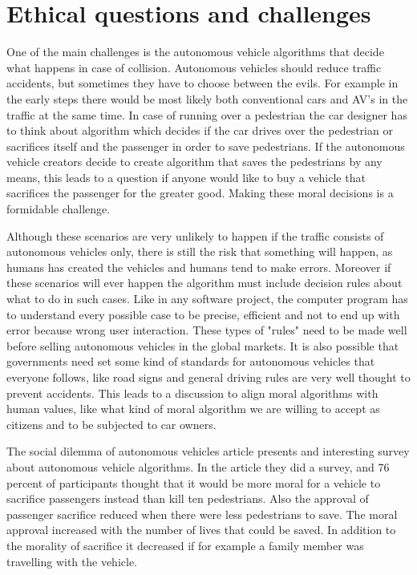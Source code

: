 \documentclass[english]{tktltiki}
\begin{document}
\section{Ethical questions and challenges}
One of the main challenges is the autonomous vehicle algorithms that decide what 
happens in case of collision. \cite{dilemma} Autonomous vehicles should reduce 
traffic accidents, but sometimes they have to choose between the evils. For 
example in the early steps there would be most likely both conventional cars and 
AV's in the traffic at the same time. In case of running over a pedestrian the 
car designer has to think about algorithm which decides if the car drives over 
the pedestrian or sacrifices itself and the passenger in order to save 
pedestrians. If the autonomous vehicle creators decide to create algorithm that 
saves the pedestrians by any means, this leads to a question if anyone would 
like to buy a vehicle that sacrifices the passenger for the greater good. Making 
these moral decisions is a formidable challenge.

Although these scenarios are very unlikely to happen if the traffic consists of 
autonomous vehicles only, there is still the risk that something will happen, as 
humans has created the vehicles and humans tend to make errors. Moreover if 
these scenarios will ever happen the algorithm must include decision rules about 
what to do in such cases. \cite{dilemma} Like in any software project, the 
computer program has to understand every possible case to be precise, efficient 
and not to end up with error because wrong user interaction. These types of 
"rules" need to be made well before selling autonomous vehicles in the global 
markets. It is also possible that governments need set some kind of standards 
for autonomous vehicles that everyone follows, like road signs and general 
driving  rules are very well thought to prevent accidents. This leads to a 
discussion to align moral algorithms with human values, like what kind of moral 
algorithm we are willing to accept as citizens and to be subjected to car 
owners. 

The social dilemma of autonomous vehicles article presents and interesting 
survey about autonomous vehicle algorithms. In the article they did a survey, 
and 76 percent of participants thought that it would be more moral for a vehicle 
to sacrifice passengers instead than kill ten pedestrians. \cite{dilemma} Also 
the approval of passenger sacrifice reduced when there were less pedestrians to 
save. The moral approval increased with the number of lives that could be saved. 
In addition to the morality of sacrifice it decreased if for example a family 
member was travelling with the vehicle.
\end{document}
